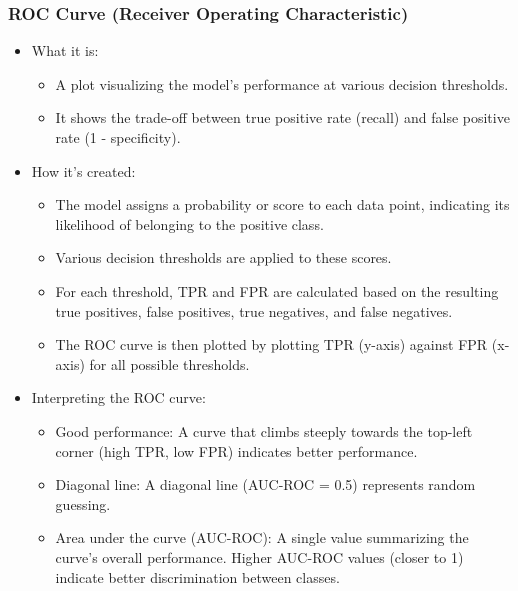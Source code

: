         \subsubsection{ROC Curve (Receiver Operating Characteristic)}
            \begin{itemize}
                \item What it is:  
                    \begin{itemize}
                        \item A plot visualizing the model's performance at various decision thresholds.
                        \item It shows the trade-off between true positive rate (recall) and false positive rate (1 - specificity).
                    \end{itemize}
                
                \item How it's created:
                    \begin{itemize}
                        \item The model assigns a probability or score to each data point, indicating its likelihood of belonging to the positive class.
                        \item Various decision thresholds are applied to these scores.
                        \item For each threshold, TPR and FPR are calculated based on the resulting true positives, false positives, true negatives, and false negatives.
                        \item The ROC curve is then plotted by plotting TPR (y-axis) against FPR (x-axis) for all possible thresholds.
                    \end{itemize}

                \item Interpreting the ROC curve:
                    \begin{itemize}
                        \item Good performance: A curve that climbs steeply towards the top-left corner (high TPR, low FPR) indicates better performance.
                        \item Diagonal line: A diagonal line (AUC-ROC = 0.5) represents random guessing.
                        \item Area under the curve (AUC-ROC): A single value summarizing the curve's overall performance. Higher AUC-ROC values (closer to 1) indicate better discrimination between classes.
                    \end{itemize}
            \end{itemize}
